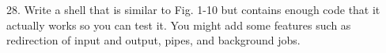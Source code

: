 \documentclass{book}
\begin{document}
28. Write a shell that is similar to Fig. 1-10 but contains enough code that it actually works so you can test it.
You might add some features such as redirection of input and output, pipes, and background jobs.

































\end{document}
